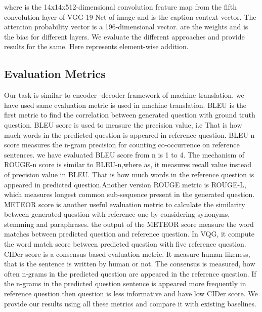 \documentclass[11pt,a4paper]{article}
\begin{document}
where  is  the 14x14x512-dimensional  convolution feature map from the fifth convolution layer of VGG-19 Net of image  and  is the caption context vector. The attention probability vector  is a 196-dimensional vector.  are the weights and  is the bias for different layers. We evaluate the different approaches and provide results for the same. Here  represents element-wise addition.


\subsection{Evaluation Metrics}
Our task is similar to encoder -decoder framework of machine translation. we have used same evaluation metric is used in machine translation. BLEU\cite{Papineni_ACL2002} is the first metric to find the correlation between generated question with ground truth question. BLEU score is used to measure the precision value, i.e That is how much words in the predicted question is appeared in reference question. BLEU-n score measures the n-gram precision for counting co-occurrence on reference sentences. we have evaluated BLEU score from n is 1 to 4. The mechanism of ROUGE-n\cite{Lin_ACL2004} score  is similar to BLEU-n,where as, it measures recall value instead of precision value in BLEU. That is how much words in the reference question is appeared in predicted question.Another version ROUGE metric is ROUGE-L, which  measures longest common sub-sequence present in the generated question. METEOR\cite{Banerjee_ACL2005} score is another useful evaluation metric to calculate the similarity between generated question with reference one by considering synonyms, stemming and paraphrases. the output of the METEOR score measure the word matches between predicted question and reference question. In VQG, it compute the word match score between predicted question with five reference question. CIDer\cite{Vedantam_CVPR2015} score is a consensus based evaluation metric.  It measure human-likeness, that is the sentence is written by human or not. The consensus is measured, how often n-grams in the predicted question are appeared in the reference question. If the n-grams in the predicted question sentence is appeared more frequently in reference question then question is less informative and have low CIDer score. We provide our results using all these metrics and compare it with existing baselines. 
	
\end{document}
